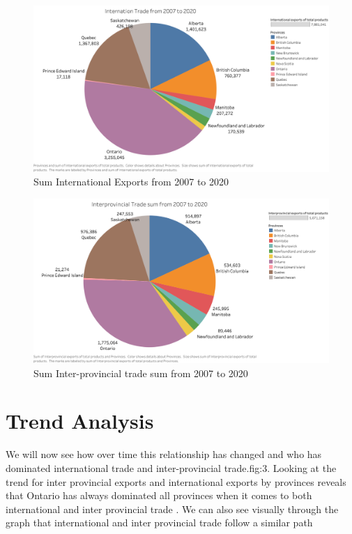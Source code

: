 \documentclass[12pt]{article}
\begin{document}
\vspace{10cm}
\begin{figure}
    \centering
    \includegraphics[width=1\linewidth]{Internatiol.png}
    \caption{Sum International Exports from 2007 to 2020}
    \label{fig:enter-label}
\end{figure}
\begin{figure}
    \centering
    \includegraphics[width=1\linewidth]{Sheet 2.png}
    \caption{Sum Inter-provincial trade sum from 2007 to 2020}
    \label{fig:enter-label}
\end{figure}
\newpage
\section*{Trend Analysis}
We will now see how over time this relationship has changed and who has dominated international trade and inter-provincial trade.{fig:3}.
Looking at the trend for inter provincial exports and international exports by provinces reveals that Ontario has always dominated all provinces when it comes to both international and inter provincial trade . 
We can also see visually through the graph that international and inter provincial trade follow a similar path 
\end{document}
